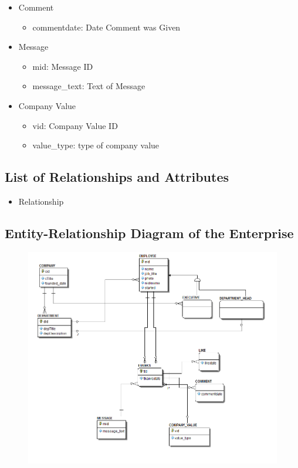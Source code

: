 \documentclass[11pt]{report}
\begin{document}
\begin{itemize}
\item Comment
    \begin{itemize}
    \item commentdate: Date Comment was Given
    \end{itemize}
\item Message
    \begin{itemize}
    \item mid: Message ID
    \item message\_text: Text of Message
    \end{itemize}
\item Company Value
    \begin{itemize}
    \item vid: Company Value ID
    \item value\_type: type of company value
    \end{itemize}
\end{itemize}
\clearpage

\subsection{List of Relationships and Attributes}
\begin{itemize}
\item Relationship
\end{itemize}
\clearpage

\subsection{Entity-Relationship Diagram of the Enterprise}

\begin{figure}[!htb]
\centering
\includegraphics[scale=.7]{./images/ERD11-4.png}
\end{figure}
\clearpage
\end{document}
